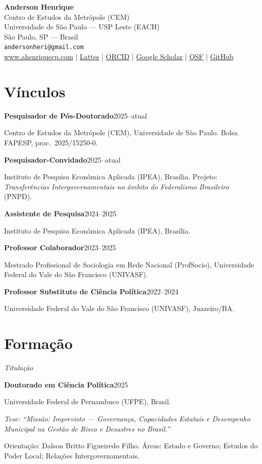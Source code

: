 \documentclass[11pt]{article}
\newcommand{\cvsubsection}[1]{\vspace{0.9em}\textit{#1}\par\vspace{0.35em}}
\newcommand{\entry}[2]{\noindent\textbf{#1}\hfill #2\par\vspace{0.15em}}
\newcommand{\detail}[1]{\noindent\hspace*{1.5em}#1\par\vspace{0.15em}}
\newcommand{\detailem}[1]{\noindent\hspace*{1.5em}\textit{#1}\par\vspace{0.15em}}
\begin{document}
\begin{center}
{\LARGE \textbf{Anderson Henrique}}\\[0.5em]
Centro de Estudos da Metrópole (CEM)\\
Universidade de São Paulo --- USP Leste (EACH)\\
São Paulo, SP --- Brasil\\[0.3em]
\texttt{andersonheri@gmail.com} \\[0.15em]
\href{https://www.ahenriquecp.com}{www.ahenriquecp.com} \quad|\quad
\href{http://lattes.cnpq.br/7628365040600511}{Lattes} \quad|\quad
\href{https://orcid.org/0000-0002-1842-2725}{ORCID} \quad|\quad
\href{https://scholar.google.com/citations?user=YGNu2fsAAAAJ}{Google Scholar} \quad|\quad
\href{https://osf.io/ysj2q/}{OSF} \quad|\quad
\href{https://github.com/andersonheri}{GitHub}
\end{center}

\vspace{1em}

\section{Vínculos}

\entry{Pesquisador de Pós-Doutorado}{2025--atual}
\detail{Centro de Estudos da Metrópole (CEM), Universidade de São Paulo. Bolsa FAPESP, proc.\ 2025/15250-0.}

\entry{Pesquisador-Convidado}{2025--atual}
\detail{Instituto de Pesquisa Econômica Aplicada (IPEA), Brasília. Projeto: \textit{Transferências Intergovernamentais no âmbito do Federalismo Brasileiro} (PNPD).}

\entry{Assistente de Pesquisa}{2024--2025}
\detail{Instituto de Pesquisa Econômica Aplicada (IPEA), Brasília.}

\entry{Professor Colaborador}{2023--2025}
\detail{Mestrado Profissional de Sociologia em Rede Nacional (ProfSocio), Universidade Federal do Vale do São Francisco (UNIVASF).}

\entry{Professor Substituto de Ciência Política}{2022--2024}
\detail{Universidade Federal do Vale do São Francisco (UNIVASF), Juazeiro/BA.}

\section{Formação}
\cvsubsection{Titulação}

\entry{Doutorado em Ciência Política}{2025}
\detail{Universidade Federal de Pernambuco (UFPE), Brasil.}
\detailem{Tese: ``Missão: Imprevisto --- Governança, Capacidades Estatais e Desempenho Municipal na Gestão de Risco e Desastres no Brasil.''}
\detail{Orientação: Dalson Britto Figueiredo Filho. Áreas: Estado e Governo; Estudos do Poder Local; Relações Intergovernamentais.}
\end{document}
